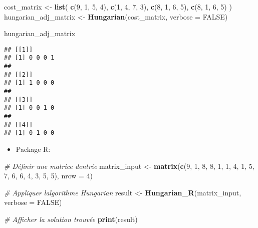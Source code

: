 \documentclass[
]{article}
\newenvironment{Shaded}{\begin{snugshade}}{\end{snugshade}}
\newcommand{\AttributeTok}[1]{\textcolor[rgb]{0.13,0.29,0.53}{#1}}
\newcommand{\CommentTok}[1]{\textcolor[rgb]{0.56,0.35,0.01}{\textit{#1}}}
\newcommand{\ConstantTok}[1]{\textcolor[rgb]{0.56,0.35,0.01}{#1}}
\newcommand{\DecValTok}[1]{\textcolor[rgb]{0.00,0.00,0.81}{#1}}
\newcommand{\FunctionTok}[1]{\textcolor[rgb]{0.13,0.29,0.53}{\textbf{#1}}}
\newcommand{\NormalTok}[1]{#1}
\newcommand{\OtherTok}[1]{\textcolor[rgb]{0.56,0.35,0.01}{#1}}
\providecommand{\tightlist}{%
  \setlength{\itemsep}{0pt}\setlength{\parskip}{0pt}}
\begin{document}
\begin{Shaded}
\begin{Highlighting}[]
\NormalTok{cost\_matrix }\OtherTok{\textless{}{-}} \FunctionTok{list}\NormalTok{(}
  \FunctionTok{c}\NormalTok{(}\DecValTok{9}\NormalTok{, }\DecValTok{1}\NormalTok{, }\DecValTok{5}\NormalTok{, }\DecValTok{4}\NormalTok{),}
  \FunctionTok{c}\NormalTok{(}\DecValTok{1}\NormalTok{, }\DecValTok{4}\NormalTok{, }\DecValTok{7}\NormalTok{, }\DecValTok{3}\NormalTok{),}
  \FunctionTok{c}\NormalTok{(}\DecValTok{8}\NormalTok{, }\DecValTok{1}\NormalTok{, }\DecValTok{6}\NormalTok{, }\DecValTok{5}\NormalTok{),}
  \FunctionTok{c}\NormalTok{(}\DecValTok{8}\NormalTok{, }\DecValTok{1}\NormalTok{, }\DecValTok{6}\NormalTok{, }\DecValTok{5}\NormalTok{)}
\NormalTok{)}
\NormalTok{hungarian\_adj\_matrix }\OtherTok{\textless{}{-}} \FunctionTok{Hungarian}\NormalTok{(cost\_matrix, }\AttributeTok{verbose =} \ConstantTok{FALSE}\NormalTok{)}

\NormalTok{hungarian\_adj\_matrix}
\end{Highlighting}
\end{Shaded}

\begin{verbatim}
## [[1]]
## [1] 0 0 0 1
## 
## [[2]]
## [1] 1 0 0 0
## 
## [[3]]
## [1] 0 0 1 0
## 
## [[4]]
## [1] 0 1 0 0
\end{verbatim}

\begin{itemize}
\tightlist
\item
  Package R:
\end{itemize}

\begin{Shaded}
\begin{Highlighting}[]
\CommentTok{\# Définir une matrice d\textquotesingle{}entrée}
\NormalTok{matrix\_input }\OtherTok{\textless{}{-}} \FunctionTok{matrix}\NormalTok{(}\FunctionTok{c}\NormalTok{(}\DecValTok{9}\NormalTok{, }\DecValTok{1}\NormalTok{, }\DecValTok{8}\NormalTok{, }\DecValTok{8}\NormalTok{, }\DecValTok{1}\NormalTok{, }\DecValTok{1}\NormalTok{, }\DecValTok{4}\NormalTok{, }\DecValTok{1}\NormalTok{, }\DecValTok{5}\NormalTok{, }\DecValTok{7}\NormalTok{, }\DecValTok{6}\NormalTok{, }\DecValTok{6}\NormalTok{, }\DecValTok{4}\NormalTok{, }\DecValTok{3}\NormalTok{, }\DecValTok{5}\NormalTok{, }\DecValTok{5}\NormalTok{), }\AttributeTok{nrow =} \DecValTok{4}\NormalTok{)}

\CommentTok{\# Appliquer l\textquotesingle{}algorithme Hungarian}
\NormalTok{result }\OtherTok{\textless{}{-}} \FunctionTok{Hungarian\_R}\NormalTok{(matrix\_input, }\AttributeTok{verbose =} \ConstantTok{FALSE}\NormalTok{)}

\CommentTok{\# Afficher la solution trouvée}
\FunctionTok{print}\NormalTok{(result)}
\end{Highlighting}
\end{Shaded}
\end{document}
